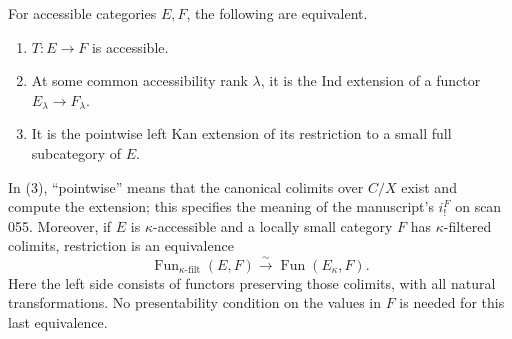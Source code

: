 \begin{theorem}\label{cat:I12}
For accessible categories $E,F$, the following are equivalent.
\begin{enumerate}
\item $T:E\to F$ is accessible.
\item At some common accessibility rank $\lambda$, it is the Ind
extension of a functor $E_\lambda\to F_\lambda$.
\item It is the pointwise left Kan extension of its restriction to a
small full subcategory of $E$.
\end{enumerate}
In (3), ``pointwise'' means that the canonical colimits over $C/X$
exist and compute the extension; this specifies the meaning of the
manuscript's $i_!^F$ on scan 055.
Moreover, if $E$ is $\kappa$-accessible and a locally small category
$F$ has $\kappa$-filtered colimits, restriction is an equivalence
\[
 \operatorname{Fun}_{\kappa\text{-filt}}(E,F)
   \xrightarrow{\sim}\operatorname{Fun}(E_\kappa,F).
\]
Here the left side consists of functors preserving those colimits,
with all natural transformations.  No presentability condition on
the values in $F$ is needed for this last equivalence.
\end{theorem}
